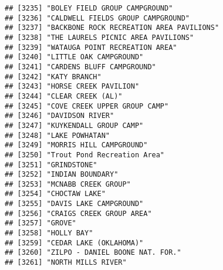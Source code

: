 \documentclass[
]{article}
\begin{document}
\begin{verbatim}
## [3235] "BOLEY FIELD GROUP CAMPGROUND"                                                        
## [3236] "CALDWELL FIELDS GROUP CAMPGROUND"                                                    
## [3237] "BACKBONE ROCK RECREATION AREA PAVILIONS"                                             
## [3238] "THE LAURELS PICNIC AREA PAVILIONS"                                                   
## [3239] "WATAUGA POINT RECREATION AREA"                                                       
## [3240] "LITTLE OAK CAMPGROUND"                                                               
## [3241] "CARDENS BLUFF CAMPGROUND"                                                            
## [3242] "KATY BRANCH"                                                                         
## [3243] "HORSE CREEK PAVILION"                                                                
## [3244] "CLEAR CREEK (AL)"                                                                    
## [3245] "COVE CREEK UPPER GROUP CAMP"                                                         
## [3246] "DAVIDSON RIVER"                                                                      
## [3247] "KUYKENDALL GROUP CAMP"                                                               
## [3248] "LAKE POWHATAN"                                                                       
## [3249] "MORRIS HILL CAMPGROUND"                                                              
## [3250] "Trout Pond Recreation Area"                                                          
## [3251] "GRINDSTONE"                                                                          
## [3252] "INDIAN BOUNDARY"                                                                     
## [3253] "MCNABB CREEK GROUP"                                                                  
## [3254] "CHOCTAW LAKE"                                                                        
## [3255] "DAVIS LAKE CAMPGROUND"                                                               
## [3256] "CRAIGS CREEK GROUP AREA"                                                             
## [3257] "GROVE"                                                                               
## [3258] "HOLLY BAY"                                                                           
## [3259] "CEDAR LAKE (OKLAHOMA)"                                                               
## [3260] "ZILPO - DANIEL BOONE NAT. FOR."                                                      
## [3261] "NORTH MILLS RIVER"                                                                   

\end{verbatim}
\end{document}
